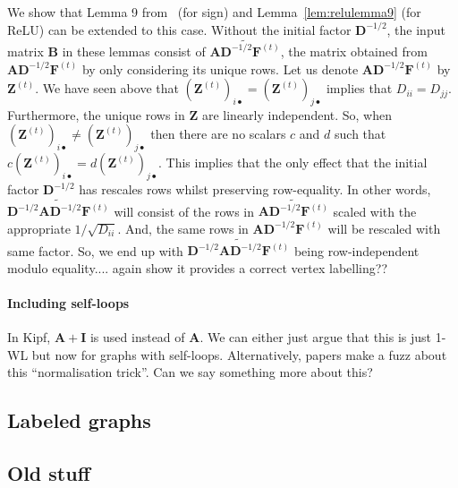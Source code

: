 We show that Lemma 9 from~\cite{grohewl} (for sign) and Lemma~\ref{lem:relulemma9} (for ReLU) can be extended to
this case. Without the initial factor  $\mathbf{D}^{-1/2}$,  the input matrix $\mathbf{B}$ in these lemmas consist of $\widetilde{\mathbf{A}\mathbf{D}^{-1/2} \mathbf{F}^{(t)}}$, the matrix obtained from $\mathbf{A}\mathbf{D}^{-1/2} \mathbf{F}^{(t)}$ by only considering its  unique rows. Let us denote  $\mathbf{A}\mathbf{D}^{-1/2} \mathbf{F}^{(t)}$ by $\mathbf{Z}^{(t)}$. 
We have seen above that $(\mathbf{Z}^{(t)})_{i\bullet}=(\mathbf{Z}^{(t)})_{j\bullet}$ implies that $D_{ii}=D_{jj}$. 
Furthermore, the unique rows in $\mathbf{Z}$ are linearly independent. So, when  $(\mathbf{Z}^{(t)})_{i\bullet}\neq (\mathbf{Z}^{(t)})_{j\bullet}$ then there are no scalars $c$ and $d$ such that $c(\mathbf{Z}^{(t)})_{i\bullet}= d(\mathbf{Z}^{(t)})_{j\bullet}$.
This implies that the only effect that the initial factor $\mathbf{D}^{-1/2}$ has rescales rows whilst preserving row-equality. 
In other words, $\widetilde{\mathbf{D}^{-1/2}\mathbf{A}\mathbf{D}^{-1/2} \mathbf{F}^{(t)}}$ will consist of the rows in 
$\widetilde{\mathbf{A}\mathbf{D}^{-1/2} \mathbf{F}^{(t)}}$ scaled with the appropriate $1/{\sqrt{D_{ii}}}$. And, the same rows in 
$\mathbf{A}\mathbf{D}^{-1/2} \mathbf{F}^{(t)}$ will be rescaled with same factor. So, we end up with  $\widetilde{\mathbf{D}^{-1/2}\mathbf{A}\mathbf{D}^{-1/2} \mathbf{F}^{(t)}}$ being row-independent modulo equality.... again show it provides a correct vertex labelling??

    

\paragraph{Including self-loops}
In Kipf, $\mathbf{A}+\mathbf{I}$ is used instead of $\mathbf{A}$. We can either just argue that this is just 1-WL but now for graphs with self-loops. Alternatively, papers make a fuzz about this ``normalisation trick''. Can we say something more about this?


\subsection{Labeled graphs}


\newpage




\subsection{Old stuff}


